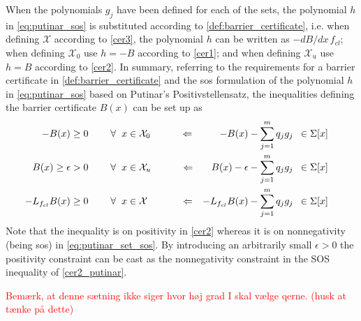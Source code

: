 When the polynomials $g_j$ have been defined for each of the sets, the polynomial $h$ in \autoref{eq:putinar_sos} is substituted according to \autoref{def:barrier_certificate}, i.e. when defining $\mathcal{X}$ according to \autoref{cer3}, the polynomial $h$ can be written as $-dB/d x \, f_{cl}$; when defining $\mathcal{X}_0$ use $h=-B$ according to \autoref{cer1}; and when defining $\mathcal{X}_u$ use $h=B$ according to \autoref{cer2}.
In summary, referring to the requirements for a barrier certificate in \autoref{def:barrier_certificate} and the \gls{sos} formulation of the polynomial $h$ in \autoref{eq:putinar_sos} based on Putinar's Positivstellensatz, the inequalities defining the barrier certificate $B(x)$ can be set up as
\begin{subequations}\label{eq:barrier_constraints_putinar}
\begin{flalign}
&&	-B(x) &\geq 0 \hspace{0.8cm}  \forall \hspace{2mm} x \in \mathcal{X}_0 \qquad\quad \Leftarrow& 	-B(x) - \sum _{j=1}^{m}q_jg_j &\,\,\,\in \Sigma[x] &&& \label{cer1_putinar}\\
&&	B(x) \geq\epsilon&> 0 \hspace{0.8cm}  \forall \hspace{2mm} x \in \mathcal{X}_u \qquad\quad \Leftarrow& 	B(x)-\epsilon - \sum _{j=1}^{m}q_jg_j &\,\,\,\in \Sigma[x] &&&\label{cer2_putinar} \\
&&	-L_{f_{cl}}B(x) &\geq 0 \hspace{0.8cm}  \forall \hspace{2mm} x \in \mathcal{X} \qquad\quad\,\, \Leftarrow& 	-L_{f_{cl}}B(x) - \sum _{j=1}^{m}q_jg_j &\,\,\,\in \Sigma[x] &&& \label{cer3_putinar}
\end{flalign}
\end{subequations}
Note that the inequality is on positivity in \autoref{cer2} whereas it is on nonnegativity (being \gls{sos}) in \autoref{eq:putinar_set_sos}. By introducing an arbitrarily small $\epsilon>0$ the positivity constraint can be cast as the nonnegativity constraint in the  SOS inequality of \autoref{cer2_putinar}. %

\textcolor{red}{Bemærk, at denne sætning ikke siger hvor høj grad I skal vælge qerne. (husk at tænke på dette)}



 








